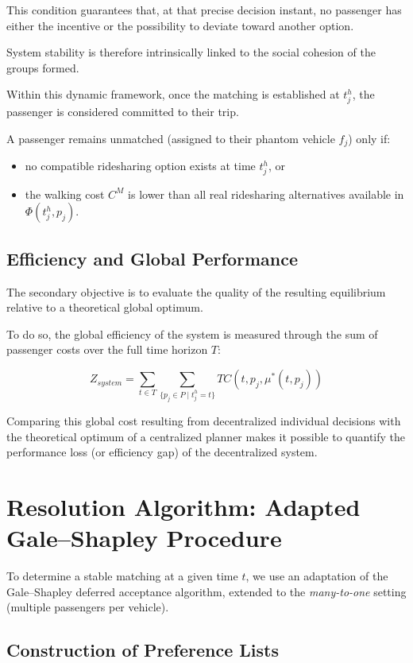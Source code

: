 \documentclass[12pt, a4paper]{article}
\begin{document}
This condition guarantees that, at that precise decision instant, no passenger has either the incentive or the possibility to deviate toward another option.

System stability is therefore intrinsically linked to the social cohesion of the groups formed.

Within this dynamic framework, once the matching is established at $t_j^h$, the passenger is considered committed to their trip.

A passenger remains unmatched (assigned to their phantom vehicle $f_j$) only if:

\begin{itemize}
    \item no compatible ridesharing option exists at time $t_j^h$, or

    \item the walking cost $C^M$ is lower than all real ridesharing alternatives available in $\Phi(t_j^h,p_j)$.
\end{itemize}

\subsection{Efficiency and Global Performance}

The secondary objective is to evaluate the quality of the resulting equilibrium relative to a theoretical global optimum.

To do so, the global efficiency of the system is measured through the sum of passenger costs over the full time horizon $T$:

$$
Z_{system}
=
\sum_{t\in T}
\sum_{\{p_j\in P\mid t_j^h=t\}}
TC\left(t,p_j,\mu^*(t,p_j)\right)
$$

Comparing this global cost resulting from decentralized individual decisions with the theoretical optimum of a centralized planner makes it possible to quantify the performance loss (or efficiency gap) of the decentralized system.


\section{Resolution Algorithm: Adapted Gale--Shapley Procedure}

To determine a stable matching at a given time $t$, we use an adaptation of the Gale--Shapley deferred acceptance algorithm, extended to the \textit{many-to-one} setting (multiple passengers per vehicle).

\subsection{Construction of Preference Lists}
\end{document}
